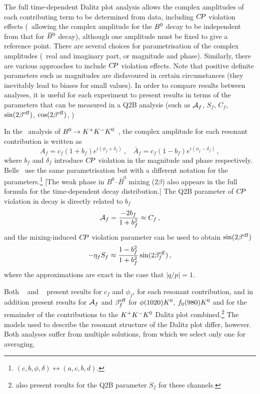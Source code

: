 The full time-dependent Dalitz plot analysis allows 
the complex amplitudes of each contributing term to be determined from data,
including $C\!P$ violation effects
(\ie\ allowing the complex amplitude for the $B^0$ decay to be independent
from that for $\kern 0.18em\overline{\kern -0.18em B}{}^0$ decay), although one amplitude must be fixed 
to give a reference point.
There are several choices for parametrisation of the complex amplitudes 
(\eg\ real and imaginary part, or magnitude and phase).
Similarly, there are various approaches to include $C\!P$ violation effects.
Note that positive definite parameters such as magnitudes are
disfavoured in certain circumstances 
(they inevitably lead to biases for small values).
In order to compare results between analyses,
it is useful for each experiment to present results in terms of the 
parameters that can be measured in a Q2B analysis
(such as ${\cal A}_{f}$, $S_f$, $C_f$, 
$\sin(2\beta^{\rm eff})$, $\cos(2\beta^{\rm eff})$, \etc)

In the \babar\ analysis of $B^0 \to K^+K^-K^0$~\cite{Lees:2012kx},
the complex amplitude for each resonant contribution is written as
\begin{equation}
  A_f = c_f ( 1 + b_f ) e^{i ( \phi_f + \delta_f )} 
  \ , \ \ \ \ 
  \bar{A}_f = c_f ( 1 - b_f ) e^{i ( \phi_f - \delta_f )} \, ,
\end{equation}
where $b_f$ and $\delta_f$ introduce $C\!P$ violation in the magnitude 
and phase respectively.
Belle~\cite{Nakahama:2010nj} use the same parametrisation but with a different notation for the parameters.\footnote{
  $(c, b, \phi, \delta) \leftrightarrow (a, c, b, d)$.
}
[The weak phase in $B^0$--$\bar{B}^0$ mixing ($2\beta$) also appears 
in the full formula for the time-dependent decay distribution.]
The Q2B parameter of $C\!P$ violation in decay is directly related to $b_f$
\begin{equation}
  {\cal A}_{f} = \frac{-2b_f}{1+b_f^2} \approx C_f \, ,
\end{equation}
and the mixing-induced $C\!P$ violation parameter can be used to obtain
$\sin(2\beta^{\rm eff})$
\begin{equation}
  -\eta_f S_f \approx \frac{1-b_f^2}{1+b_f^2}\sin(2\beta^{\rm eff}_f) \, ,
\end{equation}
where the approximations are exact in the case that $\left| q/p \right| = 1$.

Both \babar~\cite{Lees:2012kx} and \belle~\cite{Nakahama:2010nj} present results for $c_f$ and $\phi_f$,
for each resonant contribution,
and in addition present results for ${\cal A}_{f}$ and $\beta^{\rm eff}_{f}$ for $\phi(1020) K^0$, $f_0(980) K^0$ and for the remainder of the contributions to the $K^+K^-K^0$ Dalitz plot combined.\footnote{
  \babar also present results for the Q2B parameter $S_{f}$ for these channels.
}
The models used to describe the resonant structure of the Dalitz plot differ, however.  Both analyses suffer from multiple solutions, from which we select only one for averaging.

